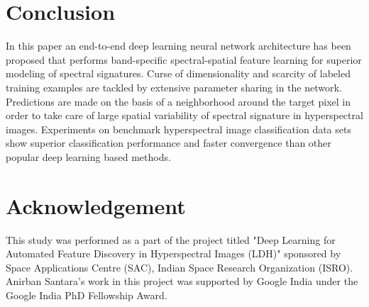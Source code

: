 \documentclass[journal]{IEEEtran}
\begin{document}
\section{Conclusion}
\label{sec:conclusion}
In this paper an end-to-end deep learning neural network architecture has been proposed that performs band-specific spectral-spatial feature learning for superior modeling of spectral signatures. Curse of dimensionality and scarcity of labeled training examples are tackled by extensive parameter sharing in the network. Predictions are made on the basis of a  neighborhood around the target pixel in order to take care of large spatial variability of spectral signature in hyperspectral images. Experiments on benchmark hyperspectral image classification data sets show superior classification performance and faster convergence than other popular deep learning based methods. 

\section{Acknowledgement}
\label{sec:acknowledgement}
This study was performed as a part of the project titled "Deep Learning for Automated Feature Discovery in Hyperspectral Images (LDH)" sponsored by Space Applications Centre (SAC), Indian Space Research Organization (ISRO). Anirban Santara's work in this project was supported by Google India under the Google India PhD Fellowship Award.



\end{document}
